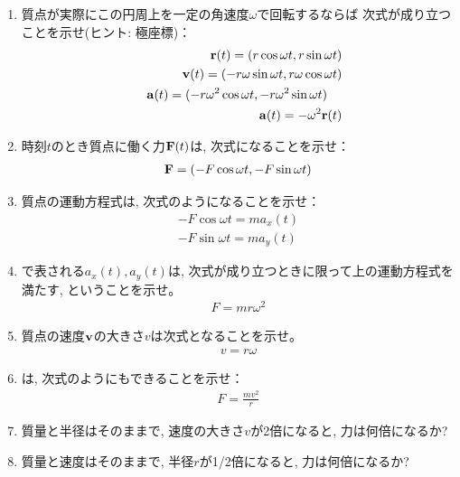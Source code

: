 \begin{q}\label{q:circle_motion}
\begin{enumerate}
\item 質点が実際にこの円周上を一定の角速度$\omega$で回転するならば
次式が成り立つことを示せ(ヒント: 極座標)：
\begin{eqnarray}
&&{\bf r}(t)=(r\cos\omega t, r\sin\omega t)\label{eq:circle_motion_xy}\\
&&{\bf v}(t)=(-r\omega\sin\omega t, r\omega\cos\omega t)\label{eq:circle_motion_vxvy}\\
&&{\bf a}(t)=(-r\omega^2\cos\omega t, -r\omega^2\sin\omega t)\label{eq:circle_motion_axay}\,\,\,\,\,\,\,\\
&&{\bf a}(t)=-\omega^2{\bf r}(t)\label{eq:circle_motion_a}
\end{eqnarray}
\item 時刻$t$のとき質点に働く力${\bf F}(t)$は, 次式になることを示せ：
\begin{eqnarray}{\bf F}=(-F\cos\omega t, -F\sin\omega t)\end{eqnarray}
\item 質点の運動方程式は, 次式のようになることを示せ：
\begin{eqnarray}
-F\cos\omega t=ma_x(t)\label{eq:circle_motion_Fx}\\
-F\sin\omega t=ma_y(t)\label{eq:circle_motion_Fy}
\end{eqnarray}
\item {}で表される$a_x(t), a_y(t)$は, 
次式が成り立つときに限って上の運動方程式を満たす, ということを示せ。
\begin{eqnarray}
F=mr\omega^2\label{eq:mromegasq}
\end{eqnarray}
\item 質点の速度${\bf v}$の大きさ$v$は次式となることを示せ。
\begin{eqnarray}
v=r\omega\label{eq:circle_motion_v_romega}
\end{eqnarray}
\item {}は, 次式のようにもできることを示せ：
\begin{eqnarray}
F=\frac{mv^2}{r}\label{eq:mvsqovr}
\end{eqnarray}
\item 質量と半径はそのままで, 速度の大きさ$v$が2倍になると, 力は何倍になるか? 
\item 質量と速度はそのままで, 半径$r$が1/2倍になると, 力は何倍になるか? 
\end{enumerate}
\end{q}
\vspace{0.2cm}

